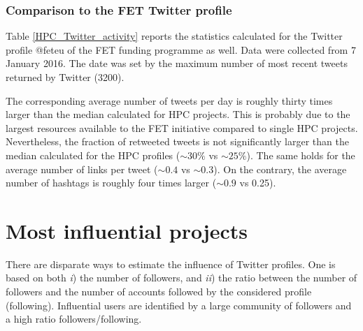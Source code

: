 \subsubsection{Comparison to the FET Twitter profile}
Table \ref{HPC_Twitter_activity} reports the statistics calculated for the Twitter profile @fet\textunderscore eu of the FET funding programme as well. Data were collected from 7 January 2016. The date was set by the maximum number of most recent tweets returned by Twitter (3200). 

The corresponding average number of tweets per day is roughly thirty times larger than the median calculated for HPC projects. This is probably due to the largest resources available to the FET initiative compared to single HPC projects. Nevertheless, the fraction of retweeted tweets is not significantly larger than the median calculated for the HPC profiles ($\sim 30\%$ vs $\sim 25\%$). The same holds for the average number of links per tweet ($\sim 0.4$ vs $\sim 0.3$). On the contrary, the average number of hashtags is roughly four times larger ($\sim 0.9$ vs 0.25).

\section{Most influential projects} \label{Most_influential_projects}
There are disparate ways to estimate the influence of Twitter profiles. One is based on both \textit{i}) the number of followers, and \textit{ii}) the ratio between the number of followers and the number of accounts followed by the considered profile (following). Influential users are identified by a large community of followers and a high ratio followers/following.

